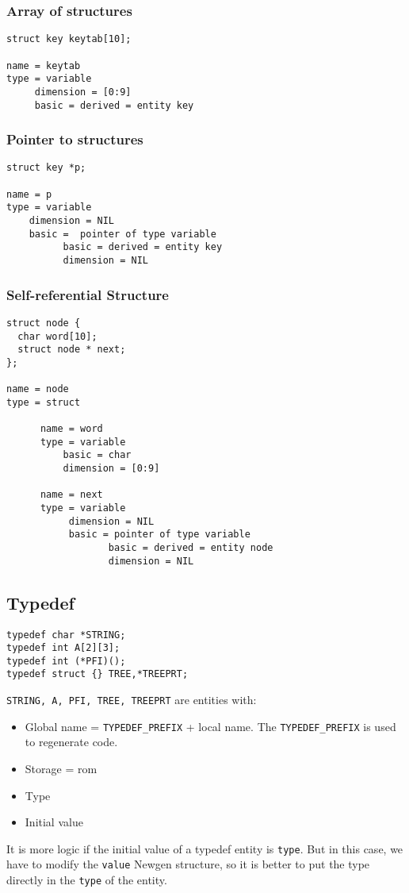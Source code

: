 \documentclass[a4paper]{article}
\begin{document}
\subsubsection{Array of structures}
\begin{verbatim}
struct key keytab[10];

name = keytab
type = variable
     dimension = [0:9]
     basic = derived = entity key
\end{verbatim}
\subsubsection{Pointer to structures}
\begin{verbatim}
struct key *p;

name = p
type = variable
    dimension = NIL
    basic =  pointer of type variable
          basic = derived = entity key
          dimension = NIL
\end{verbatim}
\subsubsection{Self-referential Structure}
\begin{verbatim}
struct node {
  char word[10];
  struct node * next;
};

name = node
type = struct 

      name = word
      type = variable
          basic = char
          dimension = [0:9] 

      name = next
      type = variable
           dimension = NIL
           basic = pointer of type variable
                  basic = derived = entity node
                  dimension = NIL
\end{verbatim}
 
\subsection{Typedef}
\begin{verbatim}
typedef char *STRING;
typedef int A[2][3];
typedef int (*PFI)();
typedef struct {} TREE,*TREEPRT;
\end{verbatim}
\verb/STRING, A, PFI, TREE, TREEPRT/ are entities with:
\begin{itemize}
\item Global name = \verb/TYPEDEF_PREFIX/ + local name. The \verb/TYPEDEF_PREFIX/ is
  used to regenerate code. 
\item Storage = rom 
\item Type 
\item Initial value
\end{itemize}
It is more logic if the initial value of a typedef entity is
\verb/type/. But in this case, we have to modify the \verb/value/ Newgen
structure, so it is better to put the type directly in the \verb/type/ of
the entity.
\end{document}
